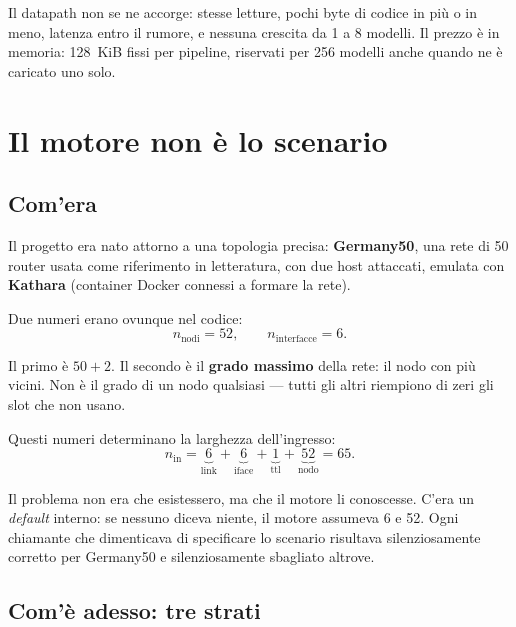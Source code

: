 \documentclass[11pt,a4paper,oneside]{report}
\begin{document}
\begin{lezione}
Il datapath non se ne accorge: stesse letture, pochi byte di codice in più o in
meno, latenza entro il rumore, e nessuna crescita da 1 a 8 modelli. Il prezzo è
in memoria: 128~KiB fissi per pipeline, riservati per 256 modelli anche quando ne
è caricato uno solo.
\end{lezione}

\chapter{Il motore non è lo scenario}

\section{Com'era}

Il progetto era nato attorno a una topologia precisa: \textbf{Germany50}, una
rete di 50 router usata come riferimento in letteratura, con due host attaccati,
emulata con \textbf{Kathara} (container Docker connessi a formare la rete).

Due numeri erano ovunque nel codice:
\[
  n_{\text{nodi}} = 52, \qquad n_{\text{interfacce}} = 6 .
\]

Il primo è $50 + 2$. Il secondo è il \textbf{grado massimo} della rete: il nodo
con più vicini. Non è il grado di un nodo qualsiasi --- tutti gli altri riempiono
di zeri gli slot che non usano.

Questi numeri determinano la larghezza dell'ingresso:
\[
  n_{\text{in}} = \underbrace{6}_{\text{link}} + \underbrace{6}_{\text{iface}}
  + \underbrace{1}_{\text{ttl}} + \underbrace{52}_{\text{nodo}} = 65 .
\]

Il problema non era che esistessero, ma che il motore li conoscesse. C'era un
\emph{default} interno: se nessuno diceva niente, il motore assumeva 6 e 52.
Ogni chiamante che dimenticava di specificare lo scenario risultava
silenziosamente corretto per Germany50 e silenziosamente sbagliato altrove.

\section{Com'è adesso: tre strati}
\end{document}
